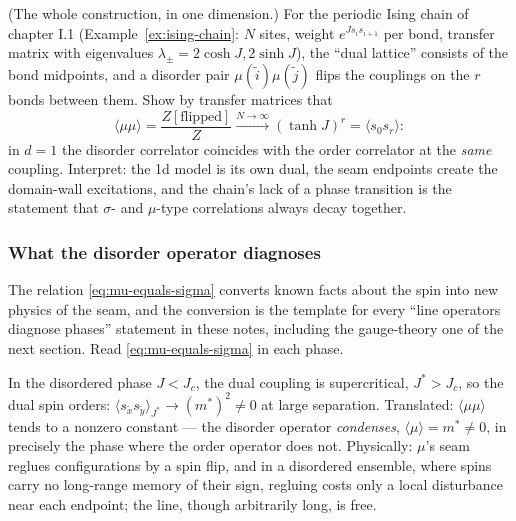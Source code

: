 \begin{exercise}[easy]
\label{exr:1d-disorder}
(The whole construction, in one dimension.) For the periodic Ising chain
of chapter I.1 (Example~\ref{ex:ising-chain}: $N$ sites, weight
$e^{J s_i s_{i+1}}$ per bond, transfer matrix with eigenvalues $\lambda_\pm
= 2\cosh J, 2\sinh J$), the ``dual lattice'' consists of the bond
midpoints, and a disorder pair $\mu(\tilde i)\mu(\tilde j)$ flips the
couplings on the $r$ bonds between them. Show by transfer matrices that
\begin{equation*}
\langle \mu \mu \rangle = \frac{Z[\text{flipped}]}{Z}
\xrightarrow{N\to\infty} (\tanh J)^{r} = \langle s_0 s_r \rangle :
\end{equation*}
in $d = 1$ the disorder correlator coincides with the order correlator at
the \emph{same} coupling. Interpret: the 1d model is its own dual, the
seam endpoints create the domain-wall excitations, and the chain's lack
of a phase transition is the statement that $\sigma$- and $\mu$-type
correlations always decay together.
\end{exercise}

\subsubsection{What the disorder operator diagnoses}
\label{sec:mu-diagnoses}

The relation \eqref{eq:mu-equals-sigma} converts known facts about the
spin into new physics of the seam, and the conversion is the template for
every ``line operators diagnose phases'' statement in these notes,
including the gauge-theory one of the next section. Read
\eqref{eq:mu-equals-sigma} in each phase.

In the disordered phase $J < J_c$, the dual coupling is supercritical,
$J^* > J_c$, so the dual spin orders:
$\langle s_{\tilde x} s_{\tilde y}\rangle_{J^*} \to (m^*)^2 \neq 0$ at
large separation. Translated: $\langle \mu\mu\rangle$ tends to a nonzero
constant --- the disorder operator \emph{condenses},
$\langle\mu\rangle = m^* \neq 0$, in precisely the phase where the order
operator does not. Physically: $\mu$'s seam reglues configurations by a
spin flip, and in a disordered ensemble, where spins carry no long-range
memory of their sign, regluing costs only a local disturbance near each
endpoint; the line, though arbitrarily long, is free.

